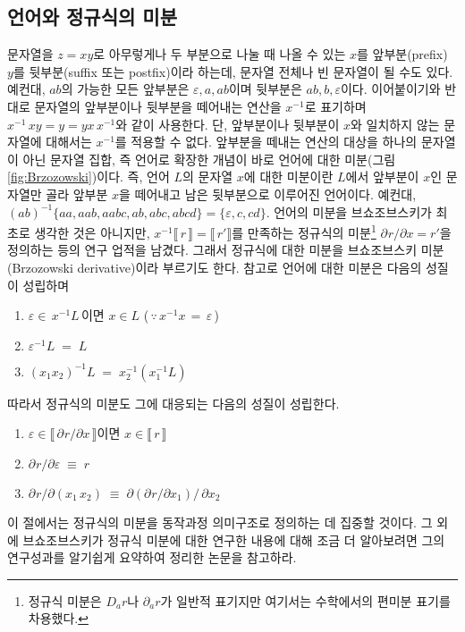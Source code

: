 \subsection{언어와 정규식의 미분}
문자열을 $z=xy$로 아무렇게나 두 부분으로 나눌 때 나올 수 있는
$x$를 앞부분(prefix) $y$를 뒷부분(suffix 또는 postfix)이라 하는데,
문자열 전체나 빈 문자열이 될 수도 있다. 예컨대, $ab$의 가능한 모든
앞부분은 $\varepsilon,a,ab$이며 뒷부분은 $ab,b,\varepsilon$이다.
이어붙이기와 반대로 문자열의 앞부분이나 뒷부분을
떼어내는 연산을 $x^{-1}$로 표기하며 $x^{-1}\,xy = y = yx\,x^{-1}$와
같이 사용한다. 단, 앞부분이나 뒷부분이 $x$와 일치하지 않는 문자열에
대해서는 $x^{-1}$를 적용할 수 없다. 앞부분을 떼내는 연산의 대상을
하나의 문자열이 아닌 문자열 집합, 즉 언어로 확장한 개념이 바로 언어에
대한 미분(그림\;\ref{fig:Brzozowski})이다.
즉, 언어 $L$의 문자열 $x$에 대한 미분이란 $L$에서 앞부분이 $x$인
문자열만 골라 앞부분 $x$을 떼어내고 남은 뒷부분으로 이루어진 언어이다.
예컨대, $(ab)^{-1} \{aa,aab,aabc,ab,abc,abcd\} = \{\varepsilon, c, cd\}$.
언어의 미분을 브쇼조브스키가 최초로 생각한 것은 아니지만,
$x^{-1} \llbracket\,r\,\rrbracket = \llbracket\,r' \rrbracket$를
만족하는 정규식의 미분\footnote{정규식 미분은 $D_a r$나
    $\partial_a r$가 일반적 표기지만
    여기서는 수학에서의 편미분 표기를 차용했다.}
$\partial_{}r/\partial x = r'$을
정의하는 등의 연구 업적을 남겼다. 그래서 정규식에 대한 미분을
브쇼조브스키 미분(Brzozowski derivative)이라 부르기도 한다.
참고로 언어에 대한 미분은 다음의 성질이 성립하며
\begin{enumerate}\tightlist
 \item $\varepsilon \in\,x^{-1} L$\,이면 $x\in L$
      ($\,\because\, x^{-1}x \,=\, \varepsilon\,$)
 \item $\varepsilon^{-1} L \;=\; L$
 \item $(x_1x_2)^{-1} L \;=\; x_2^{-1}(x_1^{-1} L)$
\end{enumerate}
따라서 정규식의 미분도 그에 대응되는 다음의 성질이 성립한다.
\begin{enumerate}\tightlist
 \item $\varepsilon \in \llbracket\,\partial_{}r/\partial x\,\rrbracket$이면
       $x\in \llbracket\,r\,\rrbracket$
 \item $\partial_{}r/\partial\varepsilon \;\equiv\; r$
 \item $\partial_{}r/\partial(x_1\,x_2) \;\equiv\;
        \partial(\partial_{}r/\partial x_1)/\,\partial x_2$
\end{enumerate}
이 절에서는 정규식의 미분을 동작과정 의미구조로 정의하는 데
집중할 것이다. 그 외에 브쇼조브스키가 정규식 미분에 대한
연구한 내용에 대해 조금 더 알아보려면 그의 연구성과\cite{Brzozowski64}를
알기쉽게 요약하여 정리한 논문\cite{Owens09REderivRE}을 참고하라.

